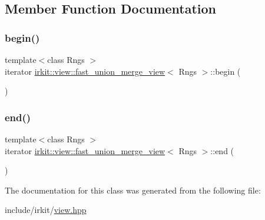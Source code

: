 \subsection{Member Function Documentation}
\mbox{\label{classirkit_1_1view_1_1fast__union__merge__view_ae204e072ecbd702c09c7813e05828138}} 
\subsubsection{\texorpdfstring{begin()}{begin()}}
{\footnotesize\ttfamily template$<$class Rngs $>$ \\
iterator \hyperlink{classirkit_1_1view_1_1fast__union__merge__view}{irkit\+::view\+::fast\+\_\+union\+\_\+merge\+\_\+view}$<$ Rngs $>$\+::begin (\begin{DoxyParamCaption}{ }\end{DoxyParamCaption})\hspace{0.3cm}{\ttfamily [inline]}}

\mbox{\label{classirkit_1_1view_1_1fast__union__merge__view_aeabbfef53da70d55173f57ca04dd1070}} 
\subsubsection{\texorpdfstring{end()}{end()}}
{\footnotesize\ttfamily template$<$class Rngs $>$ \\
iterator \hyperlink{classirkit_1_1view_1_1fast__union__merge__view}{irkit\+::view\+::fast\+\_\+union\+\_\+merge\+\_\+view}$<$ Rngs $>$\+::end (\begin{DoxyParamCaption}{ }\end{DoxyParamCaption})\hspace{0.3cm}{\ttfamily [inline]}}



The documentation for this class was generated from the following file\+:\begin{DoxyCompactItemize}
\item 
include/irkit/\hyperlink{view_8hpp}{view.\+hpp}\end{DoxyCompactItemize}
